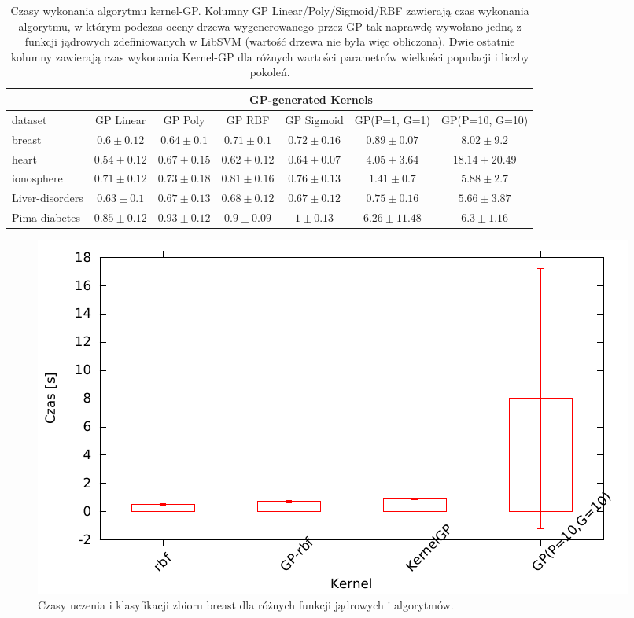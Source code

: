 \begin{table}[htbp]
\caption{Czasy wykonania algorytmu kernel-GP. Kolumny GP Linear/Poly/Sigmoid/RBF zawierają czas wykonania algorytmu, w którym podczas oceny drzewa wygenerowanego przez GP tak naprawdę wywołano jedną z funkcji jądrowych zdefiniowanych w LibSVM (wartość drzewa nie była więc obliczona). Dwie ostatnie kolumny zawierają czas wykonania Kernel-GP dla różnych wartości parametrów wielkości populacji i liczby pokoleń. }
\begin{tabular}{|l|c|c|c|c|c|c|}
\hline
 & \multicolumn{ 6}{c|}{GP-generated Kernels} \\ \hline
dataset & GP Linear & GP Poly & GP RBF & GP Sigmoid & GP(P=1, G=1) & GP(P=10, G=10) \\ \hline
breast & $ 0.6\pm 0.12 $ & $ 0.64\pm 0.1 $ & $ 0.71\pm 0.1 $ & $ 0.72\pm 0.16 $ & $ 0.89\pm 0.07 $ & $ 8.02\pm 9.2 $ \\ \hline
heart & $ 0.54\pm 0.12 $ & $ 0.67\pm 0.15 $ & $ 0.62\pm 0.12 $ & $ 0.64\pm 0.07 $ & $ 4.05\pm 3.64 $ & $ 18.14\pm 20.49 $ \\ \hline
ionosphere & $ 0.71\pm 0.12 $ & $ 0.73\pm 0.18 $ & $ 0.81\pm 0.16 $ & $ 0.76\pm 0.13 $ & $ 1.41\pm 0.7 $ & $ 5.88\pm 2.7 $ \\ \hline
Liver-disorders & $ 0.63\pm 0.1 $ & $ 0.67\pm 0.13 $ & $ 0.68\pm 0.12 $ & $ 0.67\pm 0.12 $ & $ 0.75\pm 0.16 $ & $ 5.66\pm 3.87 $ \\ \hline
Pima-diabetes & $ 0.85\pm 0.12 $ & $ 0.93\pm 0.12 $ & $ 0.9\pm 0.09 $ & $ 1\pm 0.13 $ & $ 6.26\pm 11.48 $ & $ 6.3\pm 1.16 $ \\ \hline
\end{tabular}
\label{tab:results-time-GP}
\end{table}

\begin{figure}
	\includegraphics[scale=0.60]{figures/results/time/time-breast}
	\caption{Czasy uczenia i klasyfikacji zbioru breast dla różnych funkcji jądrowych i algorytmów. \label{fig:time-some-breast}}
\end{figure} 

